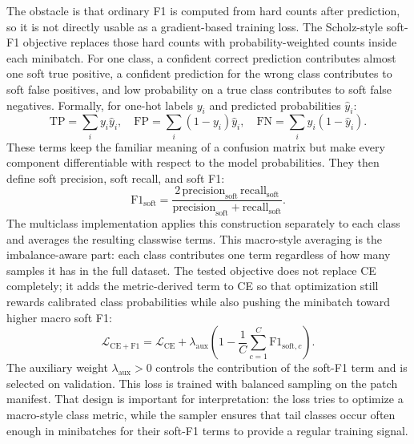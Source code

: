 \documentclass[11pt]{article}
\begin{document}
The obstacle is that ordinary F1 is computed from hard counts after prediction, so it is not directly usable as a gradient-based training loss. The Scholz-style soft-F1 objective replaces those hard counts with probability-weighted counts inside each minibatch. For one class, a confident correct prediction contributes almost one soft true positive, a confident prediction for the wrong class contributes to soft false positives, and low probability on a true class contributes to soft false negatives. Formally, for one-hot labels $y_i$ and predicted probabilities $\hat{y}_i$:
\begin{equation}
  \mathrm{TP}=\sum_i y_i\hat{y}_i,\quad
  \mathrm{FP}=\sum_i (1-y_i)\hat{y}_i,\quad
  \mathrm{FN}=\sum_i y_i(1-\hat{y}_i).
  \label{eq:soft-confusion-f1}
\end{equation}
\noindent These terms keep the familiar meaning of a confusion matrix but make every component differentiable with respect to the model probabilities. They then define soft precision, soft recall, and soft F1:
\begin{equation}
  \mathrm{F1}_{\mathrm{soft}} =
  \frac{2\,\mathrm{precision}_{\mathrm{soft}}\,\mathrm{recall}_{\mathrm{soft}}}
       {\mathrm{precision}_{\mathrm{soft}}+\mathrm{recall}_{\mathrm{soft}}}.
  \label{eq:soft-f1}
\end{equation}
\noindent The multiclass implementation applies this construction separately to each class and averages the resulting classwise terms. This macro-style averaging is the imbalance-aware part: each class contributes one term regardless of how many samples it has in the full dataset. The tested objective does not replace CE completely; it adds the metric-derived term to CE so that optimization still rewards calibrated class probabilities while also pushing the minibatch toward higher macro soft F1:
\begin{equation}
  \mathcal{L}_{\mathrm{CE+F1}} = \mathcal{L}_{\mathrm{CE}} +
  \lambda_{\mathrm{aux}}
  \left(1-\frac{1}{C}\sum_{c=1}^{C}\mathrm{F1}_{\mathrm{soft},c}\right).
  \label{eq:ce-soft-f1}
\end{equation}
\noindent The auxiliary weight $\lambda_{\mathrm{aux}}>0$ controls the contribution of the soft-F1 term and is selected on validation. This loss is trained with balanced sampling on the patch manifest. That design is important for interpretation: the loss tries to optimize a macro-style class metric, while the sampler ensures that tail classes occur often enough in minibatches for their soft-F1 terms to provide a regular training signal.
\end{document}
